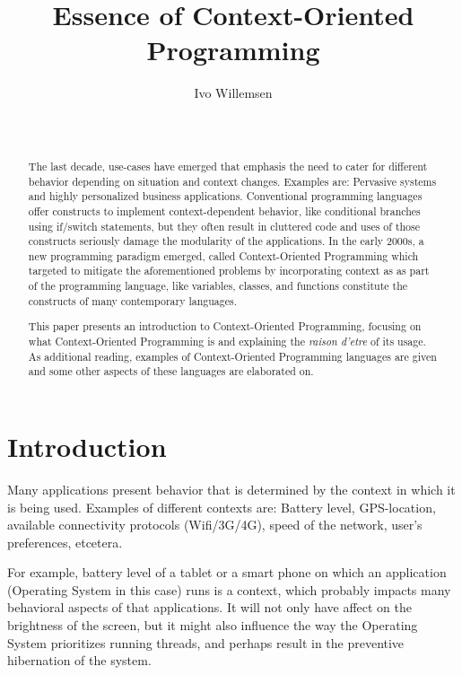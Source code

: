 \documentclass{acm_proc_article-sp}
\begin{document}
\title{Essence of Context-Oriented Programming}

\author{
\alignauthor
Ivo Willemsen\\
       \\
       \\
}

\maketitle
\begin{abstract}
The last decade, use-cases have emerged that emphasis the need to cater for different behavior depending on situation and context changes. Examples are: Pervasive systems \cite{pervasivecomputing} and highly personalized business applications. Conventional programming languages offer constructs to implement context-dependent behavior, like  conditional branches using if/switch statements, but they often result in cluttered code and uses of those 
constructs seriously damage the modularity of the applications. In the early 2000s, a new programming paradigm emerged, called Context-Oriented Programming which targeted to mitigate the aforementioned problems by incorporating context as as part of the programming language, like variables, classes, and functions constitute the constructs 
of many contemporary languages.

This paper presents an introduction to Context-Oriented Programming, focusing on what Context-Oriented Programming is and explaining the \textit{raison d'etre} of its usage. As additional reading, examples of Context-Oriented Programming languages are given and some other aspects of these languages are elaborated on.  
\end{abstract}


\section{Introduction} \label{introduction}
Many applications present behavior that is determined by the context in which it is being used. Examples of different contexts are: Battery level, GPS-location, available connectivity protocols (Wifi/3G/4G), speed of the network, user's preferences, etcetera.

For example, battery level of a tablet or a smart phone on which an application (Operating System in this case) runs is a context, which probably impacts many behavioral aspects of that applications. It will not only have affect on the brightness of the screen, but it might also influence the way the Operating System prioritizes running threads, and perhaps result in the preventive hibernation of the system.
\end{document}
